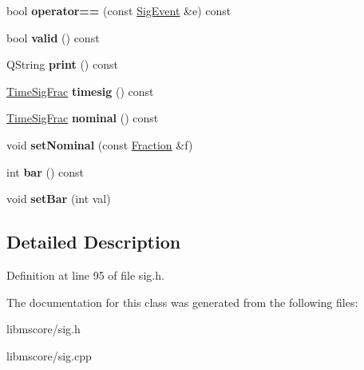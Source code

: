 \begin{DoxyCompactItemize}
\mbox{\label{class_ms_1_1_sig_event_a5b67b92381f85dc6e991984f706702f5}} 
bool {\bfseries operator==} (const \hyperlink{class_ms_1_1_sig_event}{Sig\+Event} \&e) const
\item 
\mbox{\label{class_ms_1_1_sig_event_a272ab9dcaa8cdbf8827992692612802d}} 
bool {\bfseries valid} () const
\item 
\mbox{\label{class_ms_1_1_sig_event_ade6c3dc320cf871dffb5ac106d027947}} 
Q\+String {\bfseries print} () const
\item 
\mbox{\label{class_ms_1_1_sig_event_abee5940c196ff0d86e99a07c53c47e85}} 
\hyperlink{class_ms_1_1_time_sig_frac}{Time\+Sig\+Frac} {\bfseries timesig} () const
\item 
\mbox{\label{class_ms_1_1_sig_event_a2c69ec55023fadeede2bb10cdcbfba9e}} 
\hyperlink{class_ms_1_1_time_sig_frac}{Time\+Sig\+Frac} {\bfseries nominal} () const
\item 
\mbox{\label{class_ms_1_1_sig_event_a14b128555b3f95c6cd8bf7eec05b732c}} 
void {\bfseries set\+Nominal} (const \hyperlink{class_ms_1_1_fraction}{Fraction} \&f)
\item 
\mbox{\label{class_ms_1_1_sig_event_a6a1dc8f6dbdaa48be7a7e50691f79c95}} 
int {\bfseries bar} () const
\item 
\mbox{\label{class_ms_1_1_sig_event_a6de1f1713f3081e6f4557c211d2e8366}} 
void {\bfseries set\+Bar} (int val)
\end{DoxyCompactItemize}


\subsection{Detailed Description}


Definition at line 95 of file sig.\+h.



The documentation for this class was generated from the following files\+:\begin{DoxyCompactItemize}
\item 
libmscore/sig.\+h\item 
libmscore/sig.\+cpp\end{DoxyCompactItemize}
